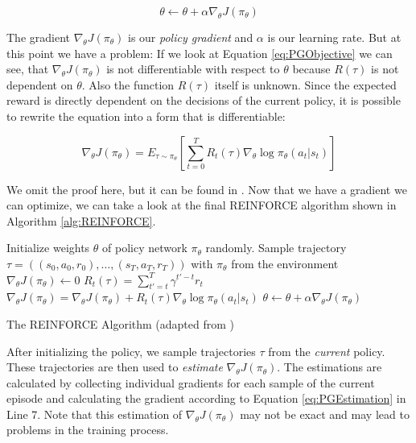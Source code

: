 \[\theta \leftarrow \theta + \alpha \nabla_\theta J(\pi_\theta)\]

The gradient $\nabla_\theta J(\pi_\theta)$ is our \textit{policy gradient} and $\alpha$ is our learning rate. But at this point we have a problem: If we look at Equation \ref{eq:PGObjective} we can see, that $\nabla_\theta J(\pi_\theta)$ is not differentiable with respect to $\theta$ because $R(\tau)$ is not dependent on $\theta$. Also the function $R(\tau)$ itself is unknown. Since the expected reward is directly dependent on the decisions of the current policy, it is possible to rewrite the equation into a form that is differentiable:

\begin{equation} \label{eq:PGEstimation}
  \nabla_\theta J(\pi_\theta) = E_{\tau \sim \pi_\theta} \left[\sum^T_{t=0}R_t(\tau) \nabla_\theta \log \pi_\theta(a_t|s_t)\right]
\end{equation}

We omit the proof here, but it can be found in \cite{foundations2019graesser}. Now that we have a gradient we can optimize, we can take a look at the final REINFORCE algorithm shown in Algorithm \ref{alg:REINFORCE}.

\begin{algorithm}[ht]
  Initialize weights $\theta$ of policy network $\pi_\theta$ randomly. \;
   {
   Sample trajectory $\tau = ((s_0, a_0, r_0), \dots, (s_T, a_T, r_T))$ with $\pi_\theta$ from the environment \;
   $\nabla_\theta J(\pi_\theta) \leftarrow 0$ \;
     {
    $R_t(\tau) = \sum^T_{t'=t} \gamma^{t'-t}r_t$ \;
    $\nabla_\theta J(\pi_\theta) = \nabla_\theta J(\pi_\theta) + R_t(\tau)\nabla_\theta \log \pi_\theta(a_t|s_t)$ \;
   }
  $\theta \leftarrow \theta + \alpha \nabla_\theta J(\pi_\theta)$
 }
  \caption[The REINFORCE Algorithm]{The REINFORCE Algorithm (adapted from \cite{foundations2019graesser})}\label{alg:REINFORCE}
 \end{algorithm}

After initializing the policy, we sample trajectories $\tau$ from the \textit{current} policy. These trajectories are then used to \textit{estimate} $\nabla_\theta J(\pi_\theta)$. The estimations are calculated by collecting individual gradients for each sample of the current episode and calculating the gradient according to Equation \ref{eq:PGEstimation} in Line 7. Note that this estimation of $\nabla_\theta J(\pi_\theta)$ may not be exact and may lead to problems in the training process. 

